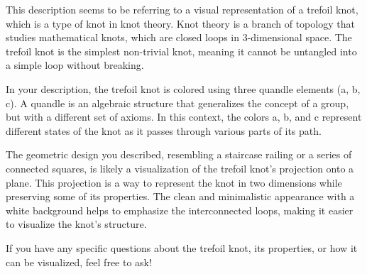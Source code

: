 This description seems to be referring to a visual representation of a trefoil knot, which is a type of knot in knot theory. Knot theory is a branch of topology that studies mathematical knots, which are closed loops in 3-dimensional space. The trefoil knot is the simplest non-trivial knot, meaning it cannot be untangled into a simple loop without breaking.

In your description, the trefoil knot is colored using three quandle elements (a, b, c). A quandle is an algebraic structure that generalizes the concept of a group, but with a different set of axioms. In this context, the colors a, b, and c represent different states of the knot as it passes through various parts of its path.

The geometric design you described, resembling a staircase railing or a series of connected squares, is likely a visualization of the trefoil knot's projection onto a plane. This projection is a way to represent the knot in two dimensions while preserving some of its properties. The clean and minimalistic appearance with a white background helps to emphasize the interconnected loops, making it easier to visualize the knot's structure.

If you have any specific questions about the trefoil knot, its properties, or how it can be visualized, feel free to ask!